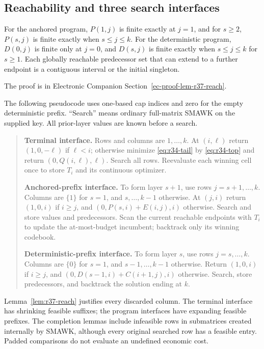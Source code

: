 \subsection{Reachability and three search interfaces}
\begin{lemma}\label{lem:r37-reach}
For the anchored program, $P(1,j)$ is finite exactly at $j=1$, and for $s\geq2$, $P(s,j)$ is finite exactly when $s\leq j\leq k$. For the deterministic program, $D(0,j)$ is finite only at $j=0$, and $D(s,j)$ is finite exactly when $s\leq j\leq k$ for $s\geq1$. Each globally reachable predecessor set that can extend to a further endpoint is a contiguous interval or the initial singleton.
\end{lemma}
\noindent The proof is in Electronic Companion Section~\ref{ec-proof-lem-r37-reach}.


The following pseudocode uses one-based cap indices and zero for the empty deterministic prefix. ``Search'' means ordinary full-matrix SMAWK on the supplied key. All prior-layer values are known before a search.
\begin{quote}\small
\textbf{Terminal interface.} Rows and columns are $1,\ldots,k$. At $(i,\ell)$ return $(1,0,-\ell)$ if $\ell<i$; otherwise minimize \eqref{eq:r34-tail} by \eqref{eq:r34-top} and return $(0,Q(i,\ell),\ell)$. Search all rows. Reevaluate each winning cell once to store $T_i$ and its continuous optimizer.

\textbf{Anchored-prefix interface.} To form layer $s+1$, use rows $j=s+1,\ldots,k$. Columns are $\{1\}$ for $s=1$, and $s,\ldots,k-1$ otherwise. At $(j,i)$ return $(1,0,i)$ if $i\geq j$, and $(0,P(s,i)+E(i,j),i)$ otherwise. Search and store values and predecessors. Scan the current reachable endpoints with $T_i$ to update the at-most-budget incumbent; backtrack only its winning codebook.

\textbf{Deterministic-prefix interface.} To form layer $s$, use rows $j=s,\ldots,k$. Columns are $\{0\}$ for $s=1$, and $s-1,\ldots,k-1$ otherwise. Return $(1,0,i)$ if $i\geq j$, and $(0,D(s-1,i)+C(i+1,j),i)$ otherwise. Search, store predecessors, and backtrack the solution ending at $k$.
\end{quote}
Lemma~\ref{lem:r37-reach} justifies every discarded column. The terminal interface has shrinking feasible suffixes; the program interfaces have expanding feasible prefixes. The completion lemmas include infeasible rows in submatrices created internally by SMAWK, although every original searched row has a feasible entry. Padded comparisons do not evaluate an undefined economic cost.

